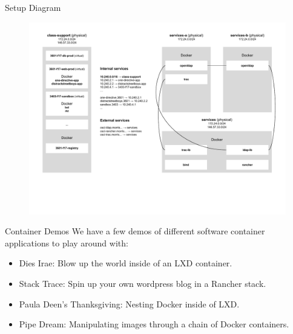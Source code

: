 \documentclass[xcolor=dvipsnames,aspectratio=1610]{beamer}
\begin{document}
  \begin{frame}{Setup Diagram}
      \vspace{-30px}
      \begin{figure}
        \includegraphics[scale=0.56]{proposal.pdf}
      \end{figure}
  \end{frame}

  \begin{frame}{Container Demos}
      We have a few demos of different software container applications to play around with: \newline
      \begin{itemize}
        \setlength\itemsep{1.6em}
        \item Dies Irae: Blow up the world inside of an LXD container.
        \item Stack Trace: Spin up your own wordpress blog in a Rancher stack.
        \item Paula Deen's Thanksgiving: Nesting Docker inside of LXD.
        \item Pipe Dream: Manipulating images through a chain of Docker containers.
      \end{itemize}

  \end{frame}
\end{document}
